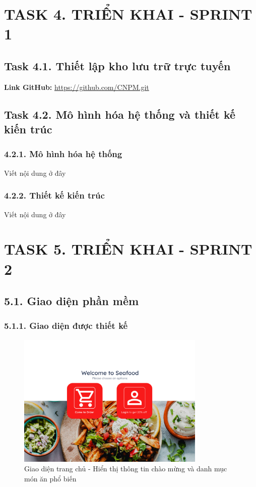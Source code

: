 \documentclass[a4paper]{article}
\begin{document}
\newpage
\section{TASK 4. TRIỂN KHAI - SPRINT 1}

\subsection{Task 4.1. Thiết lập kho lưu trữ trực tuyến}
\noindent\textbf{Link GitHub:} \href{https://github.com/Hiennguyen278610/CNPM.git}{https://github.com/CNPM.git}

\subsection{Task 4.2. Mô hình hóa hệ thống và thiết kế kiến trúc}

\subsubsection{4.2.1. Mô hình hóa hệ thống}
Viết nội dung ở đây

\subsubsection{4.2.2. Thiết kế kiến trúc}
Viết nội dung ở đây

\newpage
\section{TASK 5. TRIỂN KHAI - SPRINT 2}

\subsection{5.1. Giao diện phần mềm}

\subsubsection{5.1.1. Giao diện được thiết kế}
\begin{figure}[H]
        \centering
        \includegraphics[width=0.8\textwidth]{figmaHome.png}
        \caption{Giao diện trang chủ - Hiển thị thông tin chào mừng và danh mục món ăn phổ biến}
    \end{figure}
    
\end{document}
